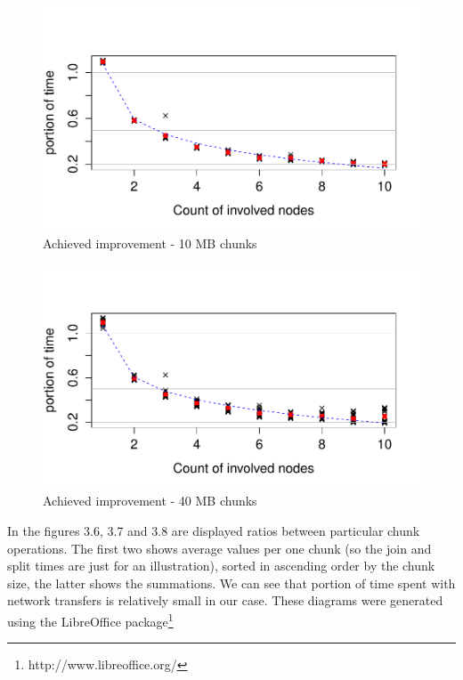\begin{figure}[h]
\begin{center}
\includegraphics[scale=0.90]{./img/Rplot10k.pdf}
\caption{Achieved improvement - 10 MB chunks}
\end{center}
\end{figure}

\begin{figure}[h]
\begin{center}
\includegraphics[scale=0.90]{./img/Rplot.pdf}
\caption{Achieved improvement - 40 MB chunks}
\end{center}
\end{figure}

In the figures 3.6, 3.7 and 3.8 are displayed ratios between particular
chunk operations. The first two shows average values per one chunk (so
the join and split times are just for an illustration), sorted in
ascending order by the chunk size, the latter shows the summations. We
can see that portion of time spent with network transfers is relatively
small in our case. These diagrams were generated using the LibreOffice
package\footnote{http://www.libreoffice.org/}

